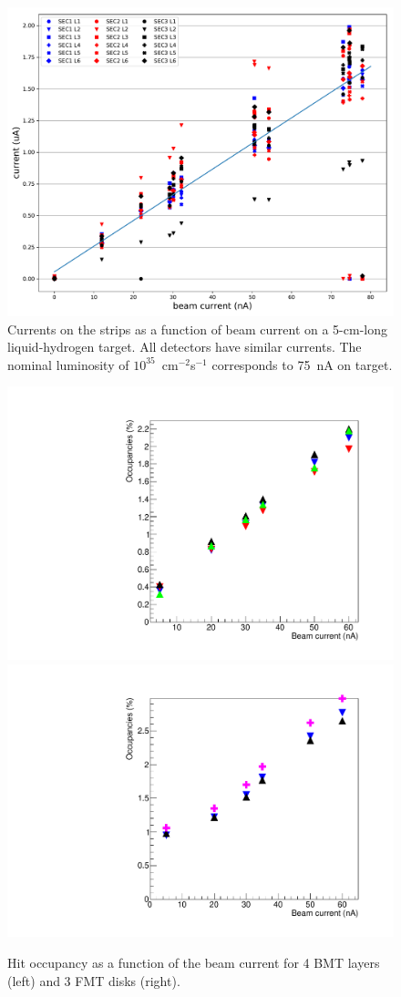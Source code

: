 \begin{figure}[htb]
 \includegraphics[width=1.0\columnwidth,keepaspectratio]{images/BMT_IvsLumi}
 \caption{Currents on the strips as a function of beam current on a 5-cm-long liquid-hydrogen target. All detectors have similar
   currents. The nominal luminosity of $10^{35}$~cm$^{-2}$s$^{-1}$ corresponds to 75~nA on target.}
 \label{fig:mm-fig14}
\end{figure}

\begin{figure}[htb]
 \includegraphics[width=.49\columnwidth,keepaspectratio]{images/OccupanciesVSbeamCurrent_BMT_only4Layers.pdf}
 \includegraphics[width=.49\columnwidth,keepaspectratio]{images/OccupanciesVSbeamCurrent_FMT_only3Layers.pdf}
 \caption{Hit occupancy as a function of the beam current for 4 BMT layers (left) and 3 FMT disks (right).}
 \label{fig:mm-fig16}
\end{figure}

